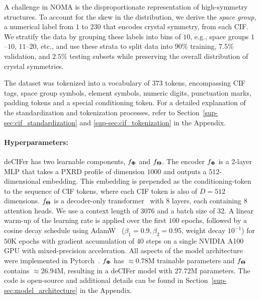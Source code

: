 A challenge in NOMA is the disproportionate representation of high-symmetry structures. To account for the skew in the distribution, we derive the \textit{space group}, a numerical label from $1$ to $230$ that encodes crystal symmetry, from each CIF. We stratify the data by grouping these labels into bins of $10$, e.g., space groups $1$--$10$, $11$--$20$, etc., and use these strata to split data into $90$\% training, $7.5$\% validation, and $2.5$\% testing subsets while preserving the overall distribution of crystal symmetries. 

The dataset was tokenized into a vocabulary of $373$ tokens, encompassing CIF tags, space group symbols, element symbols, numeric digits, punctuation marks, padding tokens and a special conditioning token. For a detailed explanation of the standardization and tokenization processes, refer to Section~\ref{sup-sec:cif_standardization} and \ref{sup-sec:cif_tokenization} in the Appendix.

\paragraph{Hyperparameters:} deCIFer has two learnable components, $f_{{\mathbf{\Phi}}}$ and $f_{{\mathbf \Theta}}$. The encoder $f_{{\mathbf{\Phi}}}$ is a 2-layer MLP that takes a PXRD profile of dimension $1000$ and outputs a $512$-dimensional embedding. This embedding is prepended as the conditioning-token to the sequence of CIF tokens, where each CIF token is also of $D=512$ dimensions. $f_{{\mathbf \Theta}}$ is a decoder-only transformer~\cite{vaswani2017attentionneed} with $8$ layers, each containing $8$ attention heads. We use a context length of $3076$ and a batch size of $32$. A linear warm-up of the learning rate is applied over the first $100$ epochs, followed by a cosine decay schedule using AdamW~\cite{AdamW2017} ($\beta_1 = 0.9, \beta_2 = 0.95$, weight decay $10^{-1}$) for $50$K epochs with gradient accumulation of $40$ steps on a single NVIDIA A100 GPU with mixed-precision acceleration. All aspects of the model architecture were implemented in Pytorch~\cite{Pytorch2019}. $f_{{\mathbf{\Phi}}}$ has $\approx\!0.78$M trainable parameters and $f_{{\mathbf \Theta}}$ contains $\approx\!26.94$M, resulting in a deCIFer model with $27.72$M parameters. The code is open-source and additional details can be found in Section~\ref{sup-sec:model_architecture} in the Appendix. 

